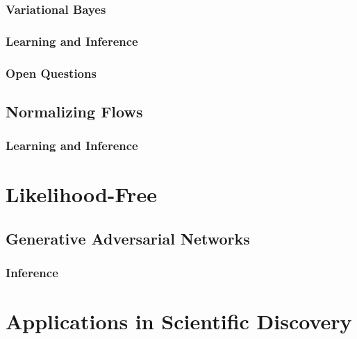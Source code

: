 			\subsubsection{Variational Bayes} %

			\subsubsection{Learning and Inference} %

			\subsubsection{Open Questions} %

		\subsection{Normalizing Flows} %

			\subsubsection{Learning and Inference} %

	\section{Likelihood-Free} %

		\subsection{Generative Adversarial Networks} %

			\subsubsection{Inference} %

	\section{Applications in Scientific Discovery} %
